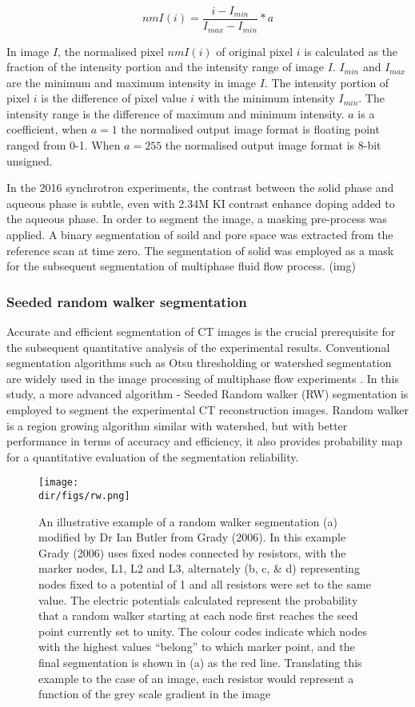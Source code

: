 $$ nmI(i)=\frac{i-I_{min}}{I_{max}-I_{min}}*a$$

In image $I$, the normalised pixel $nmI(i)$ of original pixel $i$ is calculated as the fraction of the intensity portion and the intensity range of image $I$. $I_{min}$ and $I_{max}$ are the minimum and maximum intensity in image $I$. The intensity portion of pixel $i$ is the difference of pixel value $i$ with the minimum intensity $I_{min}$. The intensity range is the difference of maximum and minimum intensity. $a$ is a coefficient, when $a=1$ the normalised output image format is floating point ranged from 0-1. When $a=255$ the normalised output image format is 8-bit unsigned.

In the 2016 synchrotron experiments, the contrast between the solid phase and aqueous phase is subtle, even with 2.34M KI contrast enhance doping added to the aqueous phase. In order to segment the image, a masking pre-process was applied. A binary segmentation of soild and pore space was extracted from the reference scan at time zero. The segmentation of solid was employed as a mask for the subsequent segmentation of multiphase fluid flow process. (img) 

\subsubsection{Seeded random walker segmentation}
Accurate and efficient segmentation of CT images is the crucial prerequisite for the subsequent quantitative analysis of the experimental results. Conventional segmentation algorithms such as Otsu thresholding \citep{otsu1979threshold} or watershed segmentation \citep{serra1983image} are widely used in the image processing of multiphase flow experiments \citep[e.g.]{andrew2015imaging,singh2016imaging}. In this study, a more advanced algorithm - Seeded Random walker (RW) segmentation \citep{grady2005multilabel} is employed to segment the experimental CT reconstruction images. Random walker is a region growing algorithm similar with watershed, but with better performance in terms of accuracy and efficiency, it also provides probability map for a quantitative evaluation of the segmentation reliability.

\begin{figure}[htbp]
  \centering
  \texttt{[image: \\dir/figs/rw.png]}
  \caption{An illustrative example of a random walker segmentation (a) modified by Dr Ian Butler from Grady (2006). In this example Grady (2006) uses fixed nodes connected by resistors, with the marker nodes, L1, L2 and L3, alternately (b, c, \& d) representing nodes fixed to a potential of 1 and all resistors were set to the same value. The electric potentials calculated represent the probability that a random walker starting at each node first reaches the seed point currently set to unity. The colour codes indicate which nodes with the highest values “belong” to which marker point, and the final segmentation is shown in (a) as the red line. Translating this example to the case of an image, each resistor would represent a function of the grey scale gradient in the image}
  \label{rw}
\end{figure}

